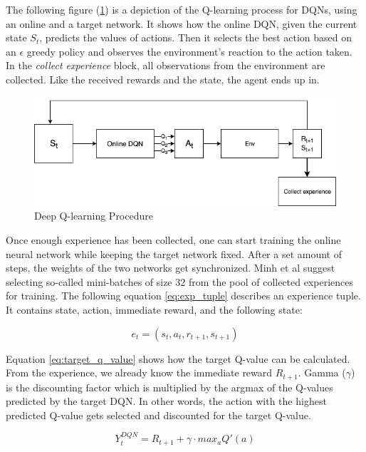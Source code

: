 \documentclass[12pt,a4paper]{article}
\begin{document}
The following figure (\ref{fig:dql_procedure}) is a depiction of the Q-learning process for DQNs, using an online and a target network. It shows how the online DQN, given the current state $S_t$, predicts the values of actions. Then it selects the best action based on an $\epsilon$ greedy policy and observes the environment's reaction to the action taken. In the {\it collect experience} block, all observations from the environment are collected. Like the received rewards and the state, the agent ends up in.

\begin{figure}
    \centering
    \includegraphics[width=0.8\linewidth]{Figures/QLearningProcedure.png}
    \caption{Deep Q-learning Procedure}
    \label{fig:dql_procedure}
\end{figure}
Once enough experience has been collected, one can start training the online neural network while keeping the target network fixed. After a set amount of steps, the weights of the two networks get synchronized. Minh et al \cite{Mnih2016} suggest selecting so-called mini-batches of size 32 from the pool of collected experiences for training. The following equation \ref{eq:exp_tuple} describes an experience tuple. It contains state, action, immediate reward, and the following state:

\begin{equation}
    \label{eq:exp_tuple}
    e_t = (s_t, a_t, r_{t+1}, s_{t+1})
\end{equation}

Equation \ref{eq:target_q_value} shows how the target Q-value can be calculated. From the experience, we already know the immediate reward $R_{t+1}$. Gamma ($\gamma$) is the discounting factor which is multiplied by the argmax of the Q-values predicted by the target DQN. In other words, the action with the highest predicted Q-value gets selected and discounted for the target Q-value.

\begin{equation}
    \label{eq:target_q_value}
    Y_t^{DQN} = R_{t+1} + \gamma \cdot max_aQ'(a)
\end{equation}
\end{document}
